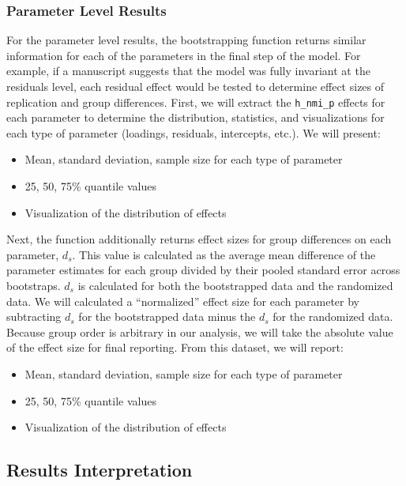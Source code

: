 \documentclass[
  man]{apa7}
\providecommand{\tightlist}{%
  \setlength{\itemsep}{0pt}\setlength{\parskip}{0pt}}
\begin{document}
\hypertarget{parameter-level-results}{%
\subsubsection{Parameter Level Results}\label{parameter-level-results}}

For the parameter level results, the bootstrapping function returns similar information for each of the parameters in the final step of the model. For example, if a manuscript suggests that the model was fully invariant at the residuals level, each residual effect would be tested to determine effect sizes of replication and group differences. First, we will extract the \texttt{h\_nmi\_p} effects for each parameter to determine the distribution, statistics, and visualizations for each type of parameter (loadings, residuals, intercepts, etc.). We will present:

\begin{itemize}
\tightlist
\item
  Mean, standard deviation, sample size for each type of parameter
\item
  25, 50, 75\% quantile values
\item
  Visualization of the distribution of effects
\end{itemize}

Next, the function additionally returns effect sizes for group differences on each parameter, \(d_s\). This value is calculated as the average mean difference of the parameter estimates for each group divided by their pooled standard error across bootstraps. \(d_s\) is calculated for both the bootstrapped data and the randomized data. We will calculated a ``normalized'' effect size for each parameter by subtracting \(d_s\) for the bootstrapped data minus the \(d_s\) for the randomized data. Because group order is arbitrary in our analysis, we will take the absolute value of the effect size for final reporting. From this dataset, we will report:

\begin{itemize}
\tightlist
\item
  Mean, standard deviation, sample size for each type of parameter
\item
  25, 50, 75\% quantile values
\item
  Visualization of the distribution of effects
\end{itemize}

\hypertarget{results-interpretation}{%
\subsection{Results Interpretation}\label{results-interpretation}}
\end{document}
